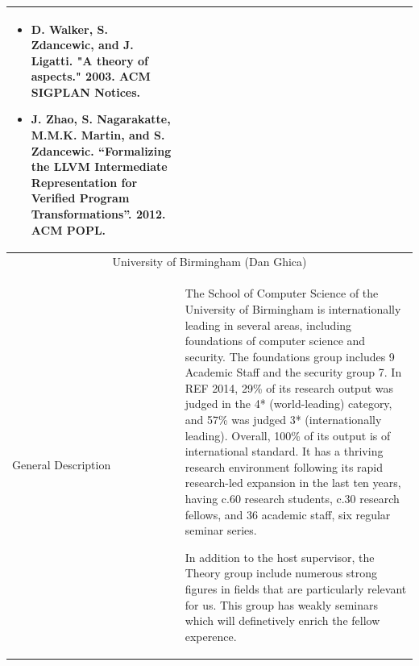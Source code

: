 \documentclass{article}[11pt]
\begin{document}
{\begin{tabular}{| l | l |}
{\begin{itemize}[leftmargin=0.5em, itemsep=0em]
      \item D. Walker, S. Zdancewic, and J. Ligatti. "A theory of aspects." 2003. ACM SIGPLAN Notices.
      \item J. Zhao, S. Nagarakatte, M.M.K. Martin, and S. Zdancewic. ``Formalizing the LLVM Intermediate Representation for Verified Program Transformations''. 2012. ACM POPL.
      \end{itemize}
    } \\
    \hline
    \hline
    \multicolumn{2}{|c|}{University of Birmingham (Dan Ghica)}\\
    \hline
    \parbox[c]{4cm}{General Description} & 
    \parbox[c]{14cm}{The School of Computer Science of the University of Birmingham is internationally
      leading in several areas, including foundations of computer science and security. The foundations group includes 9
      Academic Staff and the security group 7. In REF 2014, 29\% of its research output was judged in the 4* (world-leading)
      category, and 57\% was judged 3* (internationally leading). Overall, 100\% of its output is of international standard.
      It has a thriving research environment following its rapid research-led expansion in the last ten years, having c.60
      research students, c.30 research fellows, and 36 academic staff, six regular seminar series.

      In addition to the host supervisor, the Theory group include numerous strong figures in fields
      that are particularly relevant for us. This group has weakly seminars which will definetively enrich the fellow experence.

}
\end{tabular}}
\end{document}
